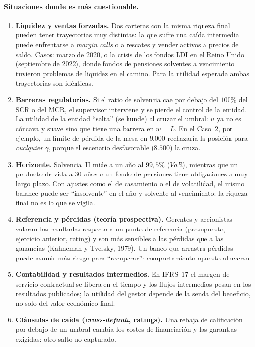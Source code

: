\documentclass[a4paper,12pt]{article}
\begin{document}
\paragraph{Situaciones donde es m\'as cuestionable.}
\begin{enumerate}[leftmargin=*,itemsep=2pt]
\item \textbf{Liquidez y ventas forzadas.} Dos carteras con la misma riqueza final pueden tener trayectorias muy distintas: la que sufre una ca\'ida intermedia puede enfrentarse a \emph{margin calls} o a rescates y vender activos a precios de saldo. Casos: marzo de 2020, o la crisis de los fondos LDI en el Reino Unido (septiembre de 2022), donde fondos de pensiones solventes a vencimiento tuvieron problemas de liquidez en el camino. Para la utilidad esperada ambas trayectorias son id\'enticas.
\item \textbf{Barreras regulatorias.} Si el ratio de solvencia cae por debajo del $100\%$ del SCR o del MCR, el supervisor interviene y se pierde el control de la entidad. La utilidad de la entidad ``salta'' (se hunde) al cruzar el umbral: $u$ ya no es c\'oncava y suave sino que tiene una barrera en $w=L$. En el Caso~2, por ejemplo, un l\'imite de p\'erdida de la mesa en $9.000$ rechazar\'ia la posici\'on para \emph{cualquier} $\gamma$, porque el escenario desfavorable ($8.500$) la cruza.
\item \textbf{Horizonte.} Solvencia~II mide a un a\~no al $99{,}5\%$ ($VaR$), mientras que un producto de vida a 30 a\~nos o un fondo de pensiones tiene obligaciones a muy largo plazo. Con ajustes como el de casamiento o el de volatilidad, el mismo balance puede ser ``insolvente'' en el a\~no y solvente al vencimiento: la riqueza final no es lo que se vigila.
\item \textbf{Referencia y p\'erdidas (teor\'ia prospectiva).} Gerentes y accionistas valoran los resultados respecto a un punto de referencia (presupuesto, ejercicio anterior, rating) y son m\'as sensibles a las p\'erdidas que a las ganancias (Kahneman y Tversky, 1979). Un banco que arrastra p\'erdidas puede asumir m\'as riesgo para ``recuperar'': comportamiento opuesto al averso.
\item \textbf{Contabilidad y resultados intermedios.} En IFRS~17 el margen de servicio contractual se libera en el tiempo y los flujos intermedios pesan en los resultados publicados; la utilidad del gestor depende de la senda del beneficio, no solo del valor econ\'omico final.
\item \textbf{Cl\'ausulas de ca\'ida (\emph{cross-default}, ratings).} Una rebaja de calificaci\'on por debajo de un umbral cambia los costes de financiaci\'on y las garant\'ias exigidas: otro salto no capturado.
\end{enumerate}
\end{document}
